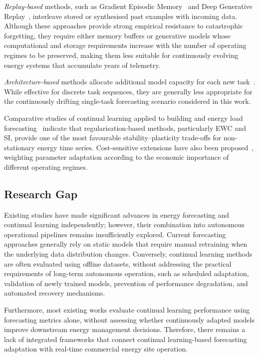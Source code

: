 \documentclass[journal]{IEEEtran}
\begin{document}
\emph{Replay-based} methods, such as Gradient Episodic
Memory~\cite{lopezpaz2017gradient} and Deep Generative
Replay~\cite{shin2017continual}, interleave stored or synthesised past
examples with incoming data. Although these approaches provide strong
empirical resistance to catastrophic forgetting, they require either
memory buffers or generative models whose computational and storage
requirements increase with the number of operating regimes to be
preserved, making them less suitable for continuously evolving energy
systems that accumulate years of telemetry.

\emph{Architecture-based} methods allocate additional model capacity for
each new task~\cite{rusu2016progressive}. While effective for discrete
task sequences, they are generally less appropriate for the continuously
drifting single-task forecasting scenario considered in this work.

Comparative studies of continual learning applied to building and energy
load forecasting~\cite{li2024building} indicate that
regularisation-based methods, particularly EWC and SI, provide one of
the most favourable stability--plasticity trade-offs for non-stationary
energy time series. Cost-sensitive extensions have also been
proposed~\cite{ng2024cost}, weighting parameter adaptation according to
the economic importance of different operating regimes.



\subsection{Research Gap}
\label{sec:gap}

Existing studies have made significant advances in energy forecasting and continual learning independently; however, their combination into autonomous operational pipelines remains insufficiently explored. Current forecasting approaches generally rely on static models that require manual retraining when the underlying data distribution changes. Conversely, continual learning methods are often evaluated using offline datasets, without addressing the practical requirements of long-term autonomous operation, such as scheduled adaptation, validation of newly trained models, prevention of performance degradation, and automated recovery mechanisms.

Furthermore, most existing works evaluate continual learning performance using forecasting metrics alone, without assessing whether continuously adapted models improve downstream energy management decisions. Therefore, there remains a lack of integrated frameworks that connect continual learning-based forecasting adaptation with real-time commercial energy site operation.
\end{document}
